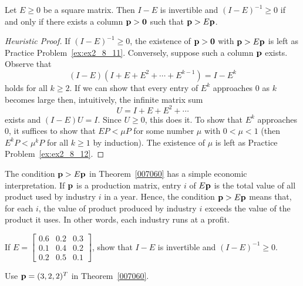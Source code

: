 \documentclass{ximera}
\begin{document}
\begin{theorem}\label{007060}
Let $E \geq 0$ be a square matrix. Then $I - E$ is invertible and $(I - E)^{-1} \geq 0$ if and only if there exists a column ${\bf p} > {\bf 0}$ such that ${\bf p} > E{\bf p}$.
\end{theorem}

\begin{proof}[Heuristic Proof]

\noindent If $(I - E)^{-1} \geq 0$, the existence of ${\bf p} > {\bf 0}$ with ${\bf p} > E{\bf p}$ is left as Practice Problem~\ref{ex:ex2_8_11}. Conversely, suppose such a column ${\bf p}$ exists. Observe that
\begin{equation*}
(I - E)(I + E + E^2 + \cdots + E^{k-1}) = I - E^k
\end{equation*}
holds for all $k \geq 2$. If we can show that every entry of $E^{k}$ approaches $0$ as $k$ becomes large then, intuitively, the infinite matrix sum
\begin{equation*}
U = I + E + E^2 + \cdots
\end{equation*}
exists and $(I - E)U = I$. Since $U \geq 0$, this does it. To show that $E^{k}$ approaches $0$, it suffices to show that $EP < \mu P$ for some number $\mu$ with $0 < \mu < 1$ (then $E^{k}P < \mu^{k}P$ for all $k \geq 1$ by induction). The existence of $\mu$ is left as Practice Problem~\ref{ex:ex2_8_12}.
\end{proof}

The condition ${\bf p} > E{\bf p}$ in Theorem~\ref{007060} has a simple economic interpretation. If ${\bf p}$ is a production matrix, entry $i$ of $E{\bf p}$ is the total value of all product used by industry $i$ in a year. Hence, the condition ${\bf p} > E{\bf p}$ means that, for each $i$, the value of product produced by industry $i$ exceeds the value of the product it uses. In other words, each industry runs at a profit.

\begin{example}\label{007075}
If $E = \begin{bmatrix}
0.6 & 0.2 & 0.3 \\
0.1 & 0.4 & 0.2 \\
0.2 & 0.5 & 0.1
\end{bmatrix}$,
 show that $I - E$ is invertible and $(I - E)^{-1} \geq 0$.


\begin{explanation}
  Use ${\bf p} = (3, 2, 2)^{T}$ in Theorem~\ref{007060}.
\end{explanation}
\end{example}
\end{document}
